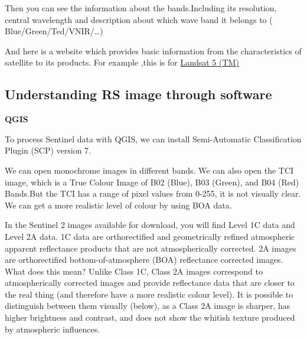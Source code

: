 \documentclass[
  letterpaper,
  DIV=11,
  numbers=noendperiod]{scrreprt}
\begin{document}
Then you can see the information about the bands.Including its
resolution, central wavelength and description about which wave band it
belongs to ( Blue/Green/Ted/VNIR/\ldots)

And here is a website which provides basic information from the
characteristics of satellite to its products. For example ,this is for
\href{https://eos.com/find-satellite/landsat-5-tm/}{Landsat 5 (TM)}

\hypertarget{understanding-rs-image-through-software}{%
\subsection{Understanding RS image through
software}\label{understanding-rs-image-through-software}}

\textbf{QGIS}

\begin{tcolorbox}[enhanced jigsaw, title=\textcolor{quarto-callout-tip-color}{\faLightbulb}\hspace{0.5em}{Tip}, coltitle=black, opacitybacktitle=0.6, toprule=.15mm, leftrule=.75mm, opacityback=0, arc=.35mm, breakable, colbacktitle=quarto-callout-tip-color!10!white, colback=white, bottomrule=.15mm, bottomtitle=1mm, toptitle=1mm, titlerule=0mm, rightrule=.15mm, left=2mm, colframe=quarto-callout-tip-color-frame]
To process Sentinel data with QGIS, we can install Semi-Automatic
Classification Plugin (SCP) version 7.
\end{tcolorbox}

We can open monochrome images in different bands. We can also open the
TCI image, which is a True Colour Image of B02 (Blue), B03 (Green), and
B04 (Red) Bands.But the TCI has a range of pixel values from 0-255, it
is not visually clear. We can get a more realistic level of colour by
using BOA data.

\begin{tcolorbox}[enhanced jigsaw, title=\textcolor{quarto-callout-note-color}{\faInfo}\hspace{0.5em}{The BOA bands}, coltitle=black, opacitybacktitle=0.6, toprule=.15mm, leftrule=.75mm, opacityback=0, arc=.35mm, breakable, colbacktitle=quarto-callout-note-color!10!white, colback=white, bottomrule=.15mm, bottomtitle=1mm, toptitle=1mm, titlerule=0mm, rightrule=.15mm, left=2mm, colframe=quarto-callout-note-color-frame]
In the Sentinel 2 images available for download, you will find Level 1C
data and Level 2A data. 1C data are orthorectified and geometrically
refined atmospheric apparent reflectance products that are not
atmospherically corrected. 2A images are orthorectified
bottom-of-atmosphere (BOA) reflectance corrected images. What does this
mean? Unlike Class 1C, Class 2A images correspond to atmospherically
corrected images and provide reflectance data that are closer to the
real thing (and therefore have a more realistic colour level). It is
possible to distinguish between them visually (below), as a Class 2A
image is sharper, has higher brightness and contrast, and does not show
the whitish texture produced by atmospheric influences.
\end{tcolorbox}
\end{document}
